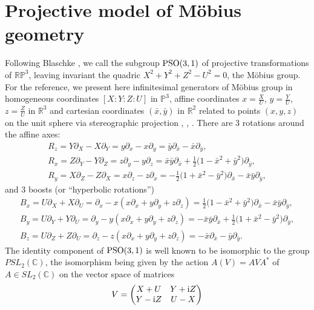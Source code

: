 \documentclass[pdftex]{sigma}
\numberwithin{equation}{section}
\begin{document}
\section{Projective model of M\"obius geometry}
Following Blaschke \cite{B-29}, we call the subgroup ${\rm PSO}(3,1)$ of projective transformations of $\mathbb{RP}^3$, leaving invariant the quadric
$
X^2+Y^2+Z^2-U^2=0$,
the M\"obius group.
For the reference, we present here infinitesimal generators of M\"obius group in homogeneous coordinates $[X:Y:Z:U]$ in $\mathbb{P}^3$, affine coordinates $x=\frac{X}{U}$, $y=\frac{Y}{U}$, $ z=\frac{Z}{U}$ in $\mathbb{R}^3$ and cartesian coordinates $(\bar{x},\bar{y})$ in $\mathbb{R}^2$ related to points $(x,y,z)$ on the unit sphere via stereographic projection
, , .
There are 3 rotations around the affine axes:
\begin{gather*}
R_z=Y\partial_X-X\partial_Y=y\partial_x-x\partial_y=\bar{y}\partial_{\bar{x}}-\bar{x}\partial_{\bar{y}},\\
R_x=Z\partial_Y-Y\partial_Z=z\partial_y-y\partial_z=\bar{x}\bar{y}\partial_{\bar{x}}+\frac{1}{2} \bigl(1-\bar{x}^2+\bar{y}^2\bigr)\partial_{\bar{y}},\\
R_y=X\partial_Z-Z\partial_X=x\partial_z-z\partial_x=-\frac{1}{2} \bigl(1+\bar{x}^2-\bar{y}^2\bigr)\partial_{\bar{x}}-\bar{x}\bar{y}\partial_{\bar{y}},
\end{gather*}
and 3 boosts (or ``hyperbolic rotations'')
\begin{gather*}
B_x=U\partial_X+X\partial_U=\partial_x-x(x\partial_x+y\partial_y+z\partial_z)=\frac{1}{2} \bigl(1-\bar{x}^2+\bar{y}^2\bigr)\partial_{\bar{x}}-\bar{x}\bar{y}\partial_{\bar{y}},\\
B_y=U\partial_Y+Y\partial_U=\partial_y-y(x\partial_x+y\partial_y+z\partial_z)= -\bar{x}\bar{y}\partial_{\bar{x}}+\frac{1}{2} \bigl(1+\bar{x}^2-\bar{y}^2\bigr)\partial_{\bar{y}},\\
B_z=U\partial_Z+Z\partial_U=\partial_z-z(x\partial_x+y\partial_y+z\partial_z)=-\bar{x}\partial_{\bar{x}}-\bar{y}\partial_{\bar{y}}.
\end{gather*}
The identity component of ${\rm PSO}(3,1)$ is well known to be isomorphic to the group $PSL_2(\mathbb{C})$, the isomorphism being given by the action $A(V)=AVA^*$ of $A\in SL_2(\mathbb{C})$ on the vector space of
matrices
\[
V=\left(
\begin{matrix}
X+U & Y+{\rm i}Z\\
Y-{\rm i}Z & U-X
\end{matrix}
\right)
\]
\end{document}
